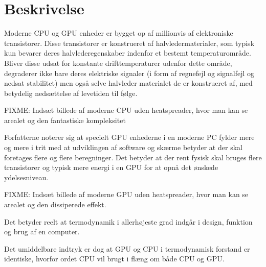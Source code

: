 \section{Beskrivelse}

Moderne CPU og GPU enheder er bygget op af millionvis af elektroniske transistorer.  Disse transistorer er konstrueret af halvledermaterialer, som typisk kun bevarer deres halvlederegenskaber indenfor et bestemt temperaturområde. Bliver disse udsat for konstante drifttemperaturer udenfor dette område, degraderer ikke bare deres elektriske signaler (i form af regnefejl og signalfejl og nedsat stabilitet) men også selve halvleder materialet de er konstrueret af, med betydelig nedsættelse af levetiden til følge.

FIXME:
Indsæt billede af moderne CPU uden heatspreader, hvor man kan se arealet og den fantastiske kompleksitet

Forfatterne noterer sig at specielt GPU enhederne i en moderne PC fylder mere og mere i trit med at udviklingen af software og skærme betyder at der skal foretages flere og flere beregninger. Det betyder at der rent fysisk skal bruges flere transistorer og typisk mere energi i en GPU for at opnå det ønskede ydelsesniveau.

FIXME:
Indsæt billede af moderne GPU uden heatspreader, hvor man kan se arealet og den dissiperede effekt.

Det betyder reelt at termodynamik i allerhøjeste grad indgår i design, funktion og brug af en computer.

Det umiddelbare indtryk er dog at GPU og CPU i termodynamisk forstand er identiske, hvorfor ordet CPU vil brugt i flæng om både CPU og GPU.


